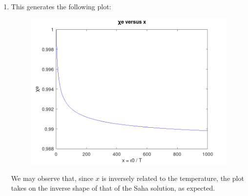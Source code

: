 \begin{enumerate}
\begin{enumerate}
      \item This generates the following plot:

        \begin{figure}[H]
          \centering
          \includegraphics[width=.7\textwidth]{Figure}
          \label{fig:1}
        \end{figure}

        We may observe that, since $x$ is inversely related to the temperature, the plot takes on the inverse shape of that of the Saha solution, as expected.

    \end{enumerate}

\end{enumerate}



